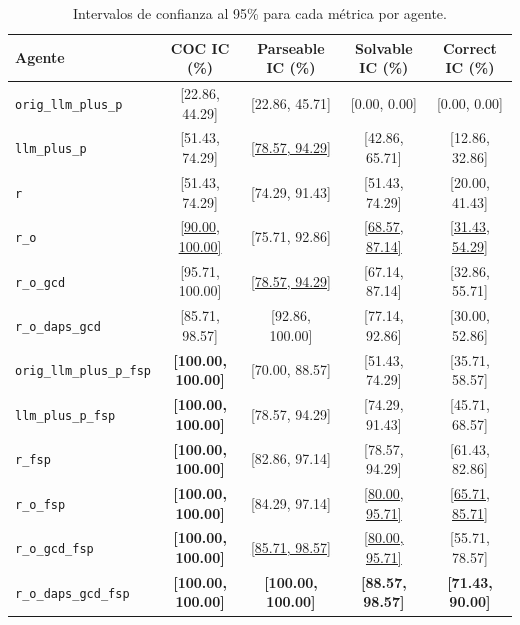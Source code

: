 \begin{table}[ht]
\centering
\small
\begin{tabular}{lcccc}
\toprule
\textbf{Agente} & \textbf{COC IC (\%)} & \textbf{Parseable IC (\%)} & \textbf{Solvable IC (\%)} & \textbf{Correct IC (\%)} \\
\midrule
\texttt{orig\_llm\_plus\_p} & \textcolor{red!70!black}{[22.86, 44.29]} & \textcolor{red!70!black}{[22.86, 45.71]} & \textcolor{red!70!black}{[0.00, 0.00]} & \textcolor{red!70!black}{[0.00, 0.00]} \\
\texttt{llm\_plus\_p} & [51.43, 74.29] & \underline{[78.57, 94.29]} & [42.86, 65.71] & [12.86, 32.86] \\
\texttt{r} & [51.43, 74.29] & [74.29, 91.43] & [51.43, 74.29] & [20.00, 41.43] \\
\texttt{r\_o} & \underline{[90.00, 100.00]} & [75.71, 92.86] & \underline{[68.57, 87.14]} & \underline{[31.43, 54.29]} \\
\texttt{r\_o\_gcd} & \textcolor{green!60!black}{[95.71, 100.00]} & \underline{[78.57, 94.29]} & [67.14, 87.14] & \textcolor{green!60!black}{[32.86, 55.71]} \\
\texttt{r\_o\_daps\_gcd} & [85.71, 98.57] & \textcolor{green!60!black}{[92.86, 100.00]} & \textcolor{green!60!black}{[77.14, 92.86]} & [30.00, 52.86] \\
\midrule
\texttt{orig\_llm\_plus\_p\_fsp} & \textbf{\textcolor{green!60!black}{[100.00, 100.00]}} & \textcolor{red!70!black}{[70.00, 88.57]} & \textcolor{red!70!black}{[51.43, 74.29]} & \textcolor{red!70!black}{[35.71, 58.57]} \\
\texttt{llm\_plus\_p\_fsp} & \textbf{\textcolor{green!60!black}{[100.00, 100.00]}} & [78.57, 94.29] & [74.29, 91.43] & [45.71, 68.57] \\
\texttt{r\_fsp} & \textbf{\textcolor{green!60!black}{[100.00, 100.00]}} & [82.86, 97.14] & [78.57, 94.29] & [61.43, 82.86] \\
\texttt{r\_o\_fsp} & \textbf{\textcolor{green!60!black}{[100.00, 100.00]}} & [84.29, 97.14] & \underline{[80.00, 95.71]} & \underline{[65.71, 85.71]} \\
\texttt{r\_o\_gcd\_fsp} & \textbf{\textcolor{green!60!black}{[100.00, 100.00]}} & \underline{[85.71, 98.57]} & \underline{[80.00, 95.71]} & [55.71, 78.57] \\
\texttt{r\_o\_daps\_gcd\_fsp} & \textbf{\textcolor{green!60!black}{[100.00, 100.00]}} & \textbf{\textcolor{green!60!black}{[100.00, 100.00]}} & \textbf{\textcolor{green!60!black}{[88.57, 98.57]}} & \textbf{\textcolor{green!60!black}{[71.43, 90.00]}} \\
\bottomrule
\end{tabular}
\caption{Intervalos de confianza al 95\% para cada métrica por agente.}
\label{tab:bootstrap_ic_agentes}
\end{table}


